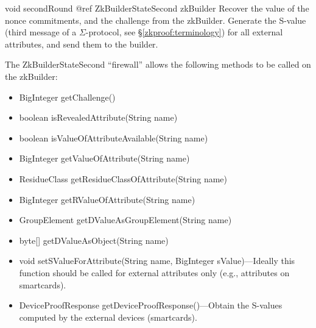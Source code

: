     \begin{method}
    {void}
    {secondRound}
    {
      {@ref ZkBuilderStateSecond zkBuilder}
    }
    Recover the value of the nonce commitments, and the challenge from the zkBuilder.
    Generate the S-value (third message of a $\Sigma$-protocol, see §\ref{zkproof:terminology}) for all external attributes, and send
    them to the builder.

    The ZkBuilderStateSecond ``firewall'' allows the following methods to be called on the zkBuilder:
      \begin{itemize}
      \item BigInteger getChallenge()
      \item boolean isRevealedAttribute(String name)
      \item boolean isValueOfAttributeAvailable(String name)
      \item BigInteger getValueOfAttribute(String name)
      \item ResidueClass getResidueClassOfAttribute(String name)
      \item BigInteger getRValueOfAttribute(String name)
      \item GroupElement getDValueAsGroupElement(String name)
      \item byte[] getDValueAsObject(String name)
      \item void setSValueForAttribute(String name, BigInteger sValue)---Ideally this function should be called
        for external attributes only (e.g., attributes on smartcards).
      \item DeviceProofResponse getDeviceProofResponse()---Obtain the S-values computed
      by the external devices (smartcards).
      \end{itemize}
    \end{method}

